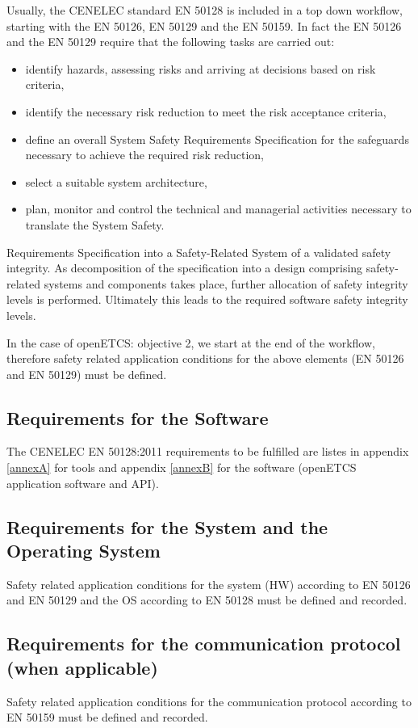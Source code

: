 \documentclass{template/openetcs_report}
\begin{document}
Usually, the CENELEC standard EN 50128 is included in a top down workflow, starting with the EN 50126, EN 50129 and the EN 50159.
In fact the EN 50126 and the EN 50129 require that the following tasks are carried out:
\begin{itemize}
  \item identify hazards, assessing risks and arriving at decisions based on risk criteria,
  \item identify the necessary risk reduction to meet the risk acceptance criteria,
  \item define an overall System Safety Requirements Specification for the safeguards necessary to achieve the required risk reduction,
  \item select a suitable system architecture,
  \item plan, monitor and control the technical and managerial activities necessary to translate the System Safety.
\end{itemize}
Requirements Specification into a Safety-Related System of a validated safety integrity. As decomposition of the specification into a design comprising safety-related systems and components takes place, further allocation of safety integrity levels is performed. Ultimately this leads to the required software safety integrity levels.

In the case of openETCS: objective 2, we start at the end of the workflow, therefore safety related application conditions for the above elements (EN 50126 and EN 50129) must be defined.


\subsection{Requirements for the Software}
The CENELEC EN 50128:2011 requirements to be fulfilled are listes in appendix \ref{annexA} for tools and appendix \ref{annexB} for the software (openETCS application software and API).

\subsection{Requirements for the System and the Operating System}
Safety related application conditions for the system (HW) according to EN 50126 and EN 50129 and the OS according to EN 50128 must be defined and recorded.

\subsection{Requirements for the communication protocol (when applicable)}
Safety related application conditions for the communication protocol according to EN 50159 must be defined and recorded.
\end{document}
